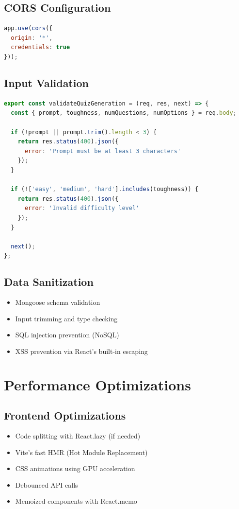 \documentclass[12pt,a4paper]{article}
\begin{document}
\subsection{CORS Configuration}
\begin{lstlisting}[language=JavaScript]
app.use(cors({
  origin: '*',
  credentials: true
}));
\end{lstlisting}

\subsection{Input Validation}
\begin{lstlisting}[language=JavaScript]
export const validateQuizGeneration = (req, res, next) => {
  const { prompt, toughness, numQuestions, numOptions } = req.body;
  
  if (!prompt || prompt.trim().length < 3) {
    return res.status(400).json({ 
      error: 'Prompt must be at least 3 characters' 
    });
  }
  
  if (!['easy', 'medium', 'hard'].includes(toughness)) {
    return res.status(400).json({ 
      error: 'Invalid difficulty level' 
    });
  }
  
  next();
};
\end{lstlisting}

\subsection{Data Sanitization}
\begin{itemize}
    \item Mongoose schema validation
    \item Input trimming and type checking
    \item SQL injection prevention (NoSQL)
    \item XSS prevention via React's built-in escaping
\end{itemize}

\newpage

\section{Performance Optimizations}

\subsection{Frontend Optimizations}
\begin{itemize}
    \item Code splitting with React.lazy (if needed)
    \item Vite's fast HMR (Hot Module Replacement)
    \item CSS animations using GPU acceleration
    \item Debounced API calls
    \item Memoized components with React.memo
\end{itemize}
\end{document}
